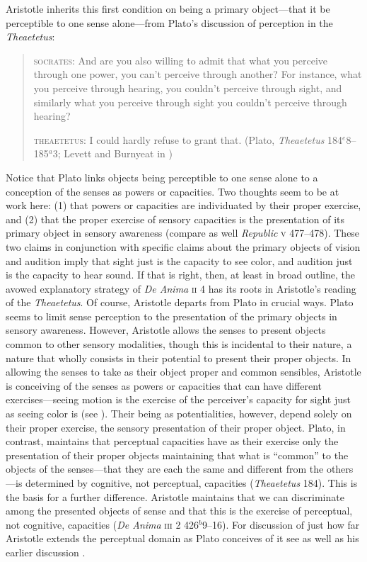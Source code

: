 Aristotle inherits this first condition on being a primary object---that it be perceptible to one sense alone---from Plato's discussion of perception in the \emph{Theaetetus}:
\begin{quotation}
	\textsc{socrates}: And are you also willing to admit that what you perceive through one power, you can't perceive through another? For instance, what you perceive through hearing, you couldn't perceive through sight, and similarly what you perceive through sight you couldn't perceive through hearing?
	
	\textsc{theaetetus}: I could hardly refuse to grant that. (Plato, \emph{Theaetetus} 184\( ^{e} \)8--185\( ^{a} \)3; Levett and Burnyeat in \citealt[204]{Cooper:1997fk})
\end{quotation}
Notice that Plato links objects being perceptible to one sense alone to a conception of the senses as powers or capacities. Two thoughts seem to be at work here: (1) that powers or capacities are individuated by their proper exercise, and (2) that the proper exercise of sensory capacities is the presentation of its primary object in sensory awareness (compare as well \emph{Republic} \textsc{v} 477--478). These two claims in conjunction with specific claims about the primary objects of vision and audition imply that sight just is the capacity to see color, and audition just is the capacity to hear sound. If that is right, then, at least in broad outline, the avowed explanatory strategy of \emph{De Anima} \textsc{ii} 4 has its roots in Aristotle's reading of the \emph{Theaetetus}. Of course, Aristotle departs from Plato in crucial ways. Plato seems to limit sense perception to the presentation of the primary objects in sensory awareness. However, Aristotle allows the senses to present objects common to other sensory modalities, though this is incidental to their nature, a nature that wholly consists in their potential to present their proper objects. In allowing the senses to take as their object proper and common sensibles, Aristotle is conceiving of the senses as powers or capacities that can have different exercises---seeing motion is the exercise of the perceiver's capacity for sight just as seeing color is (see \citealt{Freeland:1986fp}). Their being as potentialities, however, depend solely on their proper exercise, the sensory presentation of their proper object. Plato, in contrast, maintains that perceptual capacities have as their exercise only the presentation of their proper objects maintaining that what is ``common'' to the objects of the senses---that they are each the same and different from the others---is determined by cognitive, not perceptual, capacities (\emph{Theaetetus} 184). This is the basis for a further difference. Aristotle maintains that we can discriminate among the presented objects of sense and that this is the exercise of perceptual, not cognitive, capacities (\emph{De Anima} \textsc{iii} 2 426\( ^{b} \)9--16). For discussion of just how far Aristotle extends the perceptual domain as Plato conceives of it see \citealt{Sorabji:2003fk} as well as his earlier discussion \citealt{Sorabji:1971fr}.

